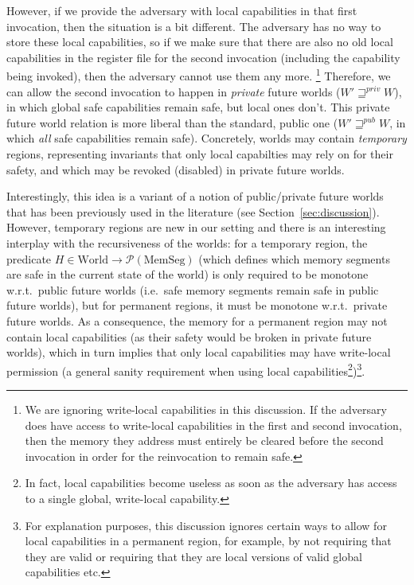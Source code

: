 \documentclass[acmsmall,review]{acmart}\settopmatter{printfolios=true}
\newcommand{\powerset}[1]{\mathcal{P}(#1)}
\newcommand{\var}[1]{\mathit{#1}}
\newcommand{\futurewk}{\mathbin{\sqsupseteq}^{\var{pub}}}
\newcommand{\futurestr}{\mathbin{\sqsupseteq}^{\var{priv}}}
\newcommand{\plaindom}[1]{\mathrm{#1}}
\newcommand{\HeapSegments}{\plaindom{MemSeg}}
\newcommand{\MemSegments}{\HeapSegments}
\newcommand{\Worlds}{\plaindom{World}}
\begin{document}
However, if we provide the adversary with local capabilities in that first
invocation, then the situation is a bit different. The adversary has no way to
store these local capabilities, so if we make sure that there are also no old
local capabilities in the register file for the second invocation (including the
capability being invoked), then the adversary cannot use them any more.%
\footnote{We are ignoring write-local capabilities in this discussion. If the
  adversary does have access to write-local capabilities in the first and second
  invocation, then the memory they address must entirely be cleared before the
  second invocation in order for the reinvocation to remain safe.} Therefore, we
can allow the second invocation to happen in \emph{private} future worlds ($W'
\futurestr W$), in which global safe capabilities remain safe, but local ones
don't. This private future world relation is more liberal than the standard,
public one ($W' \futurewk W$, in which \emph{all} safe capabilities remain
safe). Concretely, worlds may contain \emph{temporary} regions, representing
invariants that only local capabilties may rely on for their safety, and which
may be revoked (disabled) in private future worlds.

Interestingly, this idea is a variant of a notion of public/private future
worlds that has been previously used in the literature (see
Section~\ref{sec:discussion}). However, temporary regions are new in our setting
and there is an interesting interplay with the recursiveness of the worlds: for
a temporary region, the predicate $H \in \Worlds \rightarrow
\powerset{\MemSegments}$ (which defines which memory segments are safe in the
current state of the world) is only required to be monotone w.r.t.\ public
future worlds (i.e.\ safe memory segments remain safe in public future worlds),
but for permanent regions, it must be monotone w.r.t.\ private future worlds.
As a consequence, the memory for a permanent region may not contain local
capabilities (as their safety would be broken in private future worlds), which
in turn implies that only local capabilities may have write-local permission (a
general sanity requirement when using local capabilities\footnote{In fact, local
  capabilities become useless as soon as the adversary has access to a single
  global, write-local capability.})\footnote{For explanation purposes, this
  discussion ignores certain ways to allow for local capabilities in a permanent
  region, for example, by not requiring that they are valid or requiring that
  they are local versions of valid global capabilities etc.}.
\end{document}

